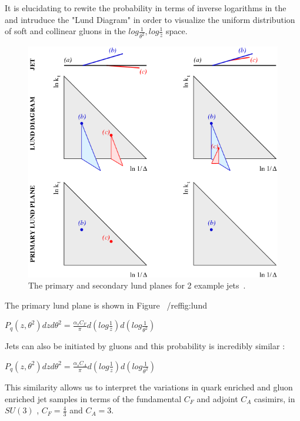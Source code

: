 It is elucidating to rewite the probability in terms of inverse logarithms in the and intruduce the "Lund Diagram" in order to visualize the uniform distribution of soft and collinear gluons in the $log \frac{1}{ \theta^2} , log\frac{1}{z} $ space.

\begin{figure}[htb]
\label{fig:lund}
\centering
\includegraphics[width=1.0\textwidth]{visuals/figs_lund.png}
\caption{The primary and secondary lund planes for 2 example jets~\cite{Dreyer:2018nbf}.}

\end{figure}


The primary lund plane is shown in Figure ~/ref{fig:lund} ~\cite{Dreyer:2018nbf}



$P_q(z,\theta^2) dz d \theta^2 = \frac{\alpha_s C_F}{\pi} d( log\frac{1}{z}  ) d(log \frac{1}{ \theta^2})  $\newline

Jets can also be initiated by gluons and this probability is incredibly similar :


$P_q(z,\theta^2) dz d \theta^2 = \frac{\alpha_s C_A}{\pi} d( log\frac{1}{z}  ) d(log \frac{1}{ \theta^2})  $\newline


This similarity allows us to interpret the variations in quark enriched and gluon enriched jet samples in terms of the fundamental $C_F$ and adjoint $C_A$ casimirs, in $SU(3)$ ,   $C_F = \frac{4}{3}$ and $C_A=3$. 


